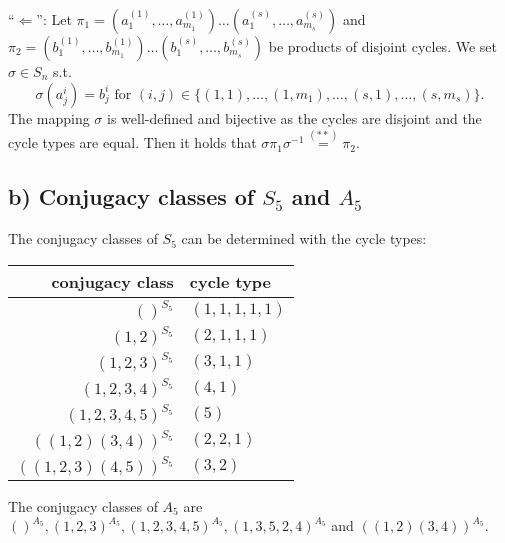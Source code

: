 ``$\Leftarrow$'': Let $\pi_1 =  (a_1^{(1)}, \dots, a_{m_1}^{(1)}) \dots (a_1^{(s)}, \dots, a_{m_s}^{(s)})$ and $\pi_2 =  (b_1^{(1)}, \dots, b_{m_1}^{(1)}) \dots (b_1^{(s)}, \dots, b_{m_s}^{(s)})$ be products of disjoint cycles. We set $\sigma \in S_n$ s.t. 
\[ \sigma(a_j^{i}) = b_j^{i} \text{ for } (i,j) \in \{(1,1), \dots, (1,m_1), \dots, (s,1), \dots, (s,m_s)\}. \] 
The mapping $\sigma$ is well-defined and bijective as the cycles are disjoint and the cycle types are equal. Then it holds that $\sigma \pi_1 \sigma^{-1} \stackrel{(\ast \ast)}{=} \pi_2$.


\subsection*{b) Conjugacy classes of $S_5$ and $A_5$}
The conjugacy classes of $S_5$ can be determined with the cycle types:


\begin{tabular}{|r|l|}
  \hline
  conjugacy class & cycle type \\\hline
  $()^{S_5}$ & $(1,1,1,1,1)$ \\
  $(1,2)^{S_5}$ & $(2,1,1,1)$ \\
  $(1,2,3)^{S_5}$ & $(3,1,1)$ \\
  $(1,2,3,4)^{S_5}$ & $(4,1)$ \\
  $(1,2,3,4,5)^{S_5}$ & $(5)$ \\
  $((1,2)(3,4))^{S_5}$ & $(2,2,1)$ \\
  $((1,2,3)(4,5))^{S_5}$ & $(3,2)$ \\\hline
\end{tabular}


The conjugacy classes of $A_5$ are $()^{A_5}, (1,2,3)^{A_5}, (1,2,3,4,5)^{A_5}, (1,3,5,2,4)^{A_5}$ and $((1,2)(3,4))^{A_5}$.